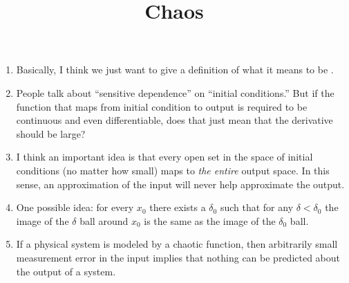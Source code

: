 \documentclass[11pt, oneside]{amsart}
\begin{document}
\title{Chaos}
\maketitle

\begin{enumerate}
  \item Basically, I think we just want to give a definition of what it
  means to be .

  \item People talk about ``sensitive dependence'' on ``initial
  conditions.'' But if the function that maps from initial condition to
  output is required to be continuous and even differentiable, does that
  just mean that the derivative should be large?

  \item I think an important idea is that every open set in the space of
  initial conditions (no matter how small) maps to \emph{the entire}
  output space. In this sense, an approximation of the input will never
  help approximate the output.

  \item One possible idea: for every $x_0$ there exists a $\delta_0$
  such that for any $\delta < \delta_0$ the image of the $\delta$ ball
  around $x_0$ is the same as the image of the $\delta_0$ ball.

  \item If a physical system is modeled by a chaotic function, then
  arbitrarily small measurement error in the input implies that nothing
  can be predicted about the output of a system.
\end{enumerate}
\end{document}
